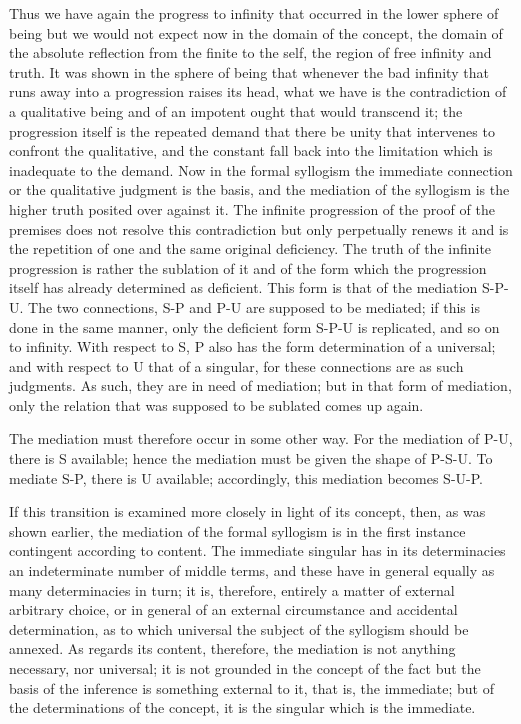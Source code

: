 Thus we have again the progress to infinity
that occurred in the lower sphere of being
but we would not expect now
in the domain of the concept,
the domain of the absolute reflection
from the finite to the self,
the region of free infinity and truth.
It was shown in the sphere of being that
whenever the bad infinity that runs away
into a progression raises its head,
what we have is the contradiction of a qualitative being
and of an impotent ought that would transcend it;
the progression itself is the repeated demand that
there be unity that intervenes to confront the qualitative,
and the constant fall back into the limitation
which is inadequate to the demand.
Now in the formal syllogism the immediate connection
or the qualitative judgment is the basis,
and the mediation of the syllogism is
the higher truth posited over against it.
The infinite progression of the proof of the premises does
not resolve this contradiction
but only perpetually renews it
and is the repetition of one and the same original deficiency.
The truth of the infinite progression is
rather the sublation of it and of the form
which the progression itself has already determined as deficient.
This form is that of the mediation S-P-U.
The two connections, S-P and P-U are supposed to be mediated;
if this is done in the same manner,
only the deficient form S-P-U is replicated,
and so on to infinity.
With respect to S, P also has the
form determination of a universal;
and with respect to U that of a singular,
for these connections are as such judgments.
As such, they are in need of mediation;
but in that form of mediation,
only the relation that was supposed
to be sublated comes up again.

The mediation must therefore occur in some other way.
For the mediation of P-U, there is S available;
hence the mediation must be given the shape of P-S-U.
To mediate S-P, there is U available;
accordingly, this mediation becomes S-U-P.

If this transition is examined more closely in light of its concept,
then, as was shown earlier, the mediation of the formal syllogism is
in the first instance contingent according to content.
The immediate singular has in its determinacies
an indeterminate number of middle terms,
and these have in general equally as many determinacies in turn;
it is, therefore, entirely a matter of external arbitrary choice,
or in general of an external circumstance and accidental determination,
as to which universal the subject of the syllogism should be annexed.
As regards its content, therefore, the mediation is
not anything necessary, nor universal;
it is not grounded in the concept of the fact
but the basis of the inference is something external to it,
that is, the immediate;
but of the determinations of the concept,
it is the singular which is the immediate.

